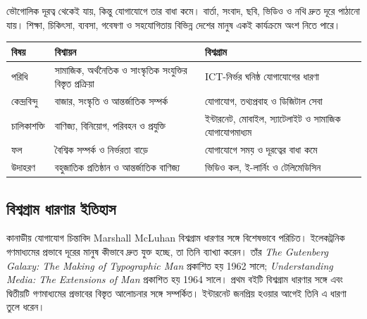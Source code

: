 \begin{topicbody}
ভৌগোলিক দূরত্ব থেকেই যায়, কিন্তু যোগাযোগে তার বাধা কমে। বার্তা, সংবাদ, ছবি, ভিডিও ও নথি দ্রুত দূরে পাঠানো যায়। শিক্ষা, চিকিৎসা, ব্যবসা, গবেষণা ও সহযোগিতায় বিভিন্ন দেশের মানুষ একই কার্যক্রমে অংশ নিতে পারে।

\begin{compacttable}
\begin{tabular}{|p{}|p{}|p{}|}
\hline
\textbf{বিষয়} & \textbf{বিশ্বায়ন} & \textbf{বিশ্বগ্রাম}\\\hline
পরিধি & সামাজিক, অর্থনৈতিক ও সাংস্কৃতিক সংযুক্তির বিস্তৃত প্রক্রিয়া & ICT-নির্ভর ঘনিষ্ঠ যোগাযোগের ধারণা\\\hline
কেন্দ্রবিন্দু & বাজার, সংস্কৃতি ও আন্তর্জাতিক সম্পর্ক & যোগাযোগ, তথ্যপ্রবাহ ও ডিজিটাল সেবা\\\hline
চালিকাশক্তি & বাণিজ্য, বিনিয়োগ, পরিবহন ও প্রযুক্তি & ইন্টারনেট, মোবাইল, স্যাটেলাইট ও সামাজিক যোগাযোগমাধ্যম\\\hline
ফল & বৈশ্বিক সম্পর্ক ও নির্ভরতা বাড়ে & যোগাযোগে সময় ও দূরত্বের বাধা কমে\\\hline
উদাহরণ & বহুজাতিক প্রতিষ্ঠান ও আন্তর্জাতিক বাণিজ্য & ভিডিও কল, ই-লার্নিং ও টেলিমেডিসিন\\\hline
\end{tabular}
\end{compacttable}

\subsection{বিশ্বগ্রাম ধারণার ইতিহাস}
কানাডীয় যোগাযোগ চিন্তাবিদ Marshall McLuhan বিশ্বগ্রাম ধারণার সঙ্গে বিশেষভাবে পরিচিত। ইলেকট্রনিক গণমাধ্যমের প্রভাবে দূরের মানুষ কীভাবে দ্রুত যুক্ত হচ্ছে, তা তিনি ব্যাখ্যা করেন। তাঁর \textit{The Gutenberg Galaxy: The Making of Typographic Man} প্রকাশিত হয় 1962 সালে; \textit{Understanding Media: The Extensions of Man} প্রকাশিত হয় 1964 সালে। প্রথম বইটি বিশ্বগ্রাম ধারণার সঙ্গে এবং দ্বিতীয়টি গণমাধ্যমের প্রভাবের বিস্তৃত আলোচনার সঙ্গে সম্পর্কিত। ইন্টারনেট জনপ্রিয় হওয়ার আগেই তিনি এ ধারণা তুলে ধরেন।


\end{topicbody}
